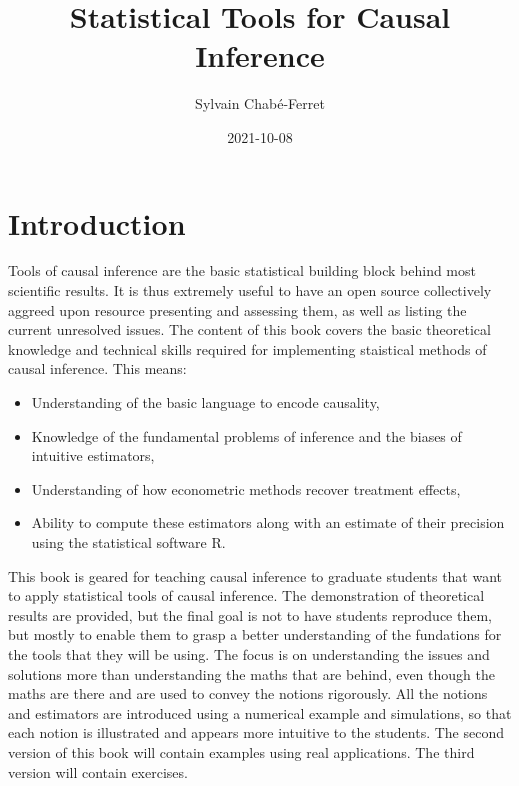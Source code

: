 \documentclass[
]{book}
\title{Statistical Tools for Causal Inference}
\author{Sylvain Chabé-Ferret}
\date{2021-10-08}
\providecommand{\tightlist}{%
  \setlength{\itemsep}{0pt}\setlength{\parskip}{0pt}}
\theoremstyle{definition}
\theoremstyle{definition}
\theoremstyle{definition}
\theoremstyle{definition}
\theoremstyle{remark}
\begin{document}
\maketitle

{
\setcounter{tocdepth}{0}
\tableofcontents
}
\hypertarget{introduction}{%
\chapter*{Introduction}\label{introduction}}

Tools of causal inference are the basic statistical building block behind most scientific results.
It is thus extremely useful to have an open source collectively aggreed upon resource presenting and assessing them, as well as listing the current unresolved issues.
The content of this book covers the basic theoretical knowledge and technical skills required for implementing staistical methods of causal inference.
This means:

\begin{itemize}
\tightlist
\item
  Understanding of the basic language to encode causality,
\item
  Knowledge of the fundamental problems of inference and the biases of intuitive estimators,
\item
  Understanding of how econometric methods recover treatment effects,
\item
  Ability to compute these estimators along with an estimate of their precision using the statistical software R.
\end{itemize}

This book is geared for teaching causal inference to graduate students that want to apply statistical tools of causal inference.
The demonstration of theoretical results are provided, but the final goal is not to have students reproduce them, but mostly to enable them to grasp a better understanding of the fundations for the tools that they will be using.
The focus is on understanding the issues and solutions more than understanding the maths that are behind, even though the maths are there and are used to convey the notions rigorously.
All the notions and estimators are introduced using a numerical example and simulations, so that each notion is illustrated and appears more intuitive to the students.
The second version of this book will contain examples using real applications.
The third version will contain exercises.
\end{document}
